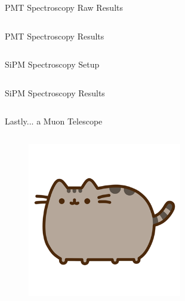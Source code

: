 \begin{columnframe}{PMT Spectroscopy Raw Results}
    \begin{column}{0.5\textwidth}
    \end{column}
    \begin{column}{0.5\textwidth}
    \end{column}
\end{columnframe}

\begin{columnframe}{PMT Spectroscopy Results}
    \begin{column}{0.5\textwidth}
    \end{column}
    \begin{column}{0.5\textwidth}
    \end{column}
\end{columnframe}

\begin{columnframe}{SiPM Spectroscopy Setup}
    \begin{column}{0.5\textwidth}
    \end{column}
    \begin{column}{0.5\textwidth}
    \end{column}
\end{columnframe}

\begin{columnframe}{SiPM Spectroscopy Results}
    \begin{column}{0.5\textwidth}
    \end{column}
    \begin{column}{0.5\textwidth}
    \end{column}
\end{columnframe}

\begin{columnframe}{Lastly... a Muon Telescope}
    \begin{column}{0.5\textwidth}
        \begin{figure}
            \centering
            \includegraphics[width=0.6\textwidth, frame]{images/pusheen.png}
        \end{figure}
    \end{column}
    \begin{column}{0.5\textwidth}
    \end{column}
\end{columnframe}

